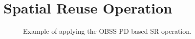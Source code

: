 \documentclass[conference]{IEEEtran}
\begin{document}
	\section{Spatial Reuse Operation}
	\label{section:sr_operation}
	
	\begin{figure}[ht!!!!]
		\centering
		\caption{Example of applying the OBSS PD-based SR operation.}
		\label{fig:scenario_example_2}
	\end{figure}
	
\end{document}
